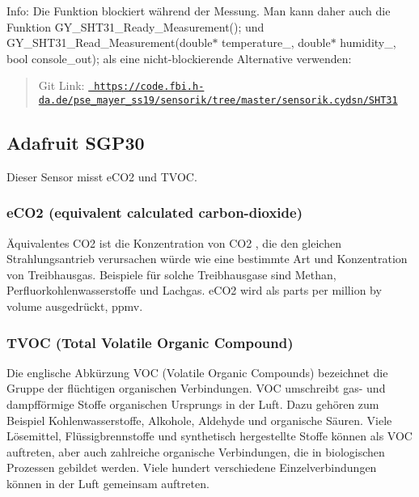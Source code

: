 Info\+: Die Funktion blockiert während der Messung. Man kann daher auch die Funktion {\ttfamily G\+Y\+\_\+\+S\+H\+T31\+\_\+\+Ready\+\_\+\+Measurement();} und {\ttfamily G\+Y\+\_\+\+S\+H\+T31\+\_\+\+Read\+\_\+\+Measurement(double$\ast$ temperature\+\_\+, double$\ast$ humidity\+\_\+, bool console\+\_\+out);} als eine nicht-\/blockierende Alternative verwenden\+: 
\begin{DoxyCode}{0}
\DoxyCodeLine{}
\end{DoxyCode}


\begin{quote}
Git Link\+: \href{https://code.fbi.h-da.de/pse_mayer_ss19/sensorik/tree/master/sensorik.cydsn/SHT31}{\texttt{ https\+://code.\+fbi.\+h-\/da.\+de/pse\+\_\+mayer\+\_\+ss19/sensorik/tree/master/sensorik.\+cydsn/\+S\+H\+T31}} \end{quote}
\hypertarget{index_autotoc_md5}{}\subsection{Adafruit S\+G\+P30}\label{index_autotoc_md5}
Dieser Sensor misst e\+C\+O2 und T\+V\+OC. \hypertarget{index_autotoc_md6}{}\subsubsection{e\+C\+O2  (equivalent calculated carbon-\/dioxide)}\label{index_autotoc_md6}
Äquivalentes C\+O2 ist die Konzentration von C\+O2 , die den gleichen Strahlungsantrieb verursachen würde wie eine bestimmte Art und Konzentration von Treibhausgas. Beispiele für solche Treibhausgase sind Methan, Perfluorkohlenwasserstoffe und Lachgas. e\+C\+O2 wird als parts per million by volume ausgedrückt, ppmv.\hypertarget{index_autotoc_md7}{}\subsubsection{T\+V\+O\+C (\+Total Volatile Organic Compound)}\label{index_autotoc_md7}
Die englische Abkürzung V\+OC (Volatile Organic Compounds) bezeichnet die Gruppe der flüchtigen organischen Verbindungen. V\+OC umschreibt gas-\/ und dampfförmige Stoffe organischen Ursprungs in der Luft. Dazu gehören zum Beispiel Kohlenwasserstoffe, Alkohole, Aldehyde und organische Säuren. Viele Lösemittel, Flüssigbrennstoffe und synthetisch hergestellte Stoffe können als V\+OC auftreten, aber auch zahlreiche organische Verbindungen, die in biologischen Prozessen gebildet werden. Viele hundert verschiedene Einzelverbindungen können in der Luft gemeinsam auftreten.

